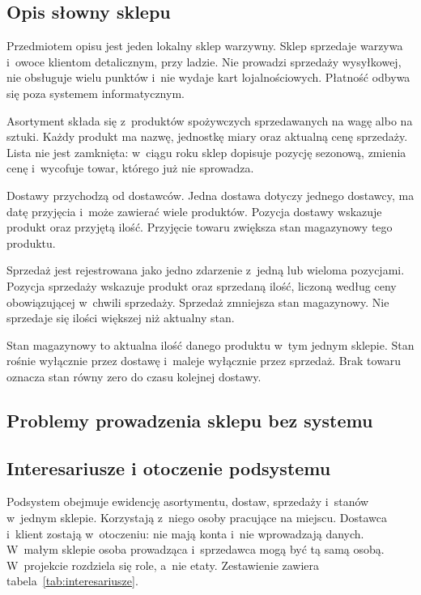 \subsection{Opis słowny sklepu}
\label{sec:opis-sklepu}

Przedmiotem opisu jest jeden lokalny sklep warzywny. Sklep sprzedaje warzywa i~owoce klientom detalicznym, przy ladzie. Nie prowadzi sprzedaży wysyłkowej, nie obsługuje wielu punktów i~nie wydaje kart lojalnościowych. Płatność odbywa się poza systemem informatycznym.

Asortyment składa się z~produktów spożywczych sprzedawanych na wagę albo na sztuki. Każdy produkt ma nazwę, jednostkę miary oraz aktualną cenę sprzedaży. Lista nie jest zamknięta: w~ciągu roku sklep dopisuje pozycję sezonową, zmienia cenę i~wycofuje towar, którego już nie sprowadza.

Dostawy przychodzą od dostawców. Jedna dostawa dotyczy jednego dostawcy, ma datę przyjęcia i~może zawierać wiele produktów. Pozycja dostawy wskazuje produkt oraz przyjętą ilość. Przyjęcie towaru zwiększa stan magazynowy tego produktu.

Sprzedaż jest rejestrowana jako jedno zdarzenie z~jedną lub wieloma pozycjami. Pozycja sprzedaży wskazuje produkt oraz sprzedaną ilość, liczoną według ceny obowiązującej w~chwili sprzedaży. Sprzedaż zmniejsza stan magazynowy. Nie sprzedaje się ilości większej niż aktualny stan.

Stan magazynowy to aktualna ilość danego produktu w~tym jednym sklepie. Stan rośnie wyłącznie przez dostawę i~maleje wyłącznie przez sprzedaż. Brak towaru oznacza stan równy zero do czasu kolejnej dostawy.

\subsection{Problemy prowadzenia sklepu bez systemu}
\label{sec:problemy}

\subsection{Interesariusze i otoczenie podsystemu}
\label{sec:interesariusze}

Podsystem obejmuje ewidencję asortymentu, dostaw, sprzedaży i~stanów w~jednym sklepie. Korzystają z~niego osoby pracujące na miejscu. Dostawca i~klient zostają w~otoczeniu: nie mają konta i~nie wprowadzają danych. W~małym sklepie osoba prowadząca i~sprzedawca mogą być tą samą osobą. W~projekcie rozdziela się role, a~nie etaty. Zestawienie zawiera tabela~\ref{tab:interesariusze}.

